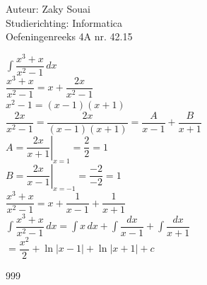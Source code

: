 \documentclass[a4paper]{article}
\begin{document}
  
\noindent \large Auteur: Zaky Souai \\
\noindent \large Studierichting:  Informatica\\
\noindent \large Oefeningenreeks 4A nr. 42.15\\

\bigskip

\normalsize

$\displaystyle \int \dfrac{x^3+x}{x^2-1}\,dx$\\

$\displaystyle \dfrac{x^3+x}{x^2-1}=x+\dfrac{2x}{x^2-1}$\\

$\displaystyle x^2-1=(x-1)(x+1)$\\

$\displaystyle \dfrac{2x}{x^2-1}=\dfrac{2x}{(x-1)(x+1)}=\dfrac{A}{x-1}+\dfrac{B}{x+1}$\\

$\displaystyle A=\left.\dfrac{2x}{x+1}\right|_{x=1}=\dfrac{2}{2}=1$\\

$\displaystyle B=\left.\dfrac{2x}{x-1}\right|_{x=-1}=\dfrac{-2}{-2}=1$\\

$\displaystyle \dfrac{x^3+x}{x^2-1}=x+\dfrac{1}{x-1}+\dfrac{1}{x+1}$\\

$\displaystyle \int \dfrac{x^3+x}{x^2-1}\,dx=\int x\,dx+\int\dfrac{dx}{x-1}+\int\dfrac{dx}{x+1}$\\

$\displaystyle =\dfrac{x^2}{2}+\ln|x-1|+\ln|x+1|+c$\\


\begin{thebibliography}{999}
\end{thebibliography}
\end{document}
